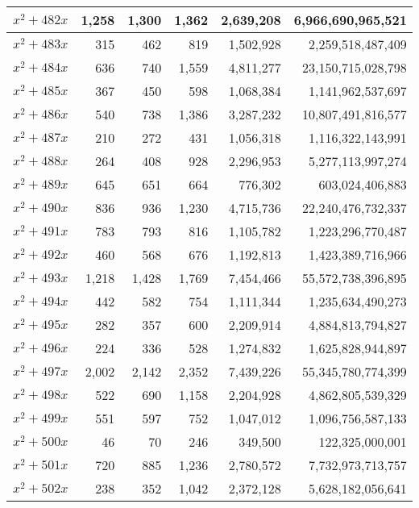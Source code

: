 \documentclass[a4paper]{amsproc}
\theoremstyle{plain}
\begin{document}
\begin{longtable}{ | l | r | r | r | r | r | }
$x^2 + 482x$ & 1{,}258 & 1{,}300 & 1{,}362 & 2{,}639{,}208 & 6{,}966{,}690{,}965{,}521 \\ \hline
$x^2 + 483x$ & 315 & 462 & 819 & 1{,}502{,}928 & 2{,}259{,}518{,}487{,}409 \\ \hline
$x^2 + 484x$ & 636 & 740 & 1{,}559 & 4{,}811{,}277 & 23{,}150{,}715{,}028{,}798 \\ \hline
$x^2 + 485x$ & 367 & 450 & 598 & 1{,}068{,}384 & 1{,}141{,}962{,}537{,}697 \\ \hline
$x^2 + 486x$ & 540 & 738 & 1{,}386 & 3{,}287{,}232 & 10{,}807{,}491{,}816{,}577 \\ \hline
$x^2 + 487x$ & 210 & 272 & 431 & 1{,}056{,}318 & 1{,}116{,}322{,}143{,}991 \\ \hline
$x^2 + 488x$ & 264 & 408 & 928 & 2{,}296{,}953 & 5{,}277{,}113{,}997{,}274 \\ \hline
$x^2 + 489x$ & 645 & 651 & 664 & 776{,}302 & 603{,}024{,}406{,}883 \\ \hline
$x^2 + 490x$ & 836 & 936 & 1{,}230 & 4{,}715{,}736 & 22{,}240{,}476{,}732{,}337 \\ \hline
$x^2 + 491x$ & 783 & 793 & 816 & 1{,}105{,}782 & 1{,}223{,}296{,}770{,}487 \\ \hline
$x^2 + 492x$ & 460 & 568 & 676 & 1{,}192{,}813 & 1{,}423{,}389{,}716{,}966 \\ \hline
$x^2 + 493x$ & 1{,}218 & 1{,}428 & 1{,}769 & 7{,}454{,}466 & 55{,}572{,}738{,}396{,}895 \\ \hline
$x^2 + 494x$ & 442 & 582 & 754 & 1{,}111{,}344 & 1{,}235{,}634{,}490{,}273 \\ \hline
$x^2 + 495x$ & 282 & 357 & 600 & 2{,}209{,}914 & 4{,}884{,}813{,}794{,}827 \\ \hline
$x^2 + 496x$ & 224 & 336 & 528 & 1{,}274{,}832 & 1{,}625{,}828{,}944{,}897 \\ \hline
$x^2 + 497x$ & 2{,}002 & 2{,}142 & 2{,}352 & 7{,}439{,}226 & 55{,}345{,}780{,}774{,}399 \\ \hline
$x^2 + 498x$ & 522 & 690 & 1{,}158 & 2{,}204{,}928 & 4{,}862{,}805{,}539{,}329 \\ \hline
$x^2 + 499x$ & 551 & 597 & 752 & 1{,}047{,}012 & 1{,}096{,}756{,}587{,}133 \\ \hline
$x^2 + 500x$ & 46 & 70 & 246 & 349{,}500 & 122{,}325{,}000{,}001 \\ \hline
$x^2 + 501x$ & 720 & 885 & 1{,}236 & 2{,}780{,}572 & 7{,}732{,}973{,}713{,}757 \\ \hline
$x^2 + 502x$ & 238 & 352 & 1{,}042 & 2{,}372{,}128 & 5{,}628{,}182{,}056{,}641 \\ \hline

\end{longtable}
\end{document}
